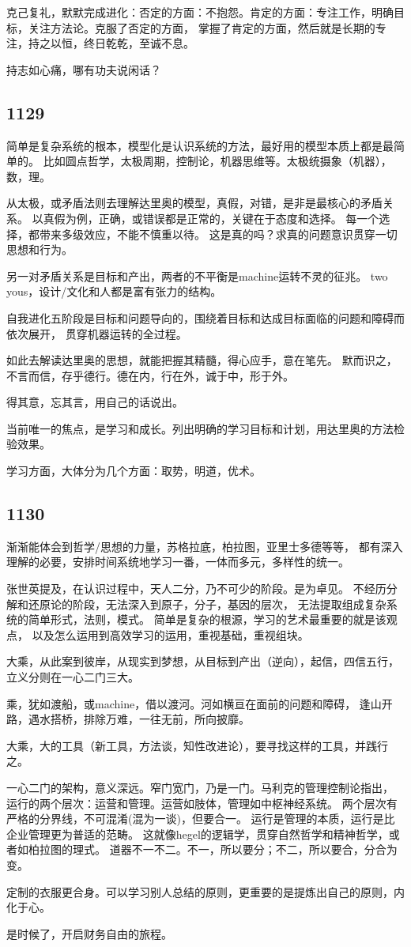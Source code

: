克己复礼，默默完成进化：否定的方面：不抱怨。肯定的方面：专注工作，明确目标，关注方法论。克服了否定的方面，
掌握了肯定的方面，然后就是长期的专注，持之以恒，终日乾乾，至诚不息。

持志如心痛，哪有功夫说闲话？

\subsection{1129}

简单是复杂系统的根本，模型化是认识系统的方法，最好用的模型本质上都是最简单的。
比如圆点哲学，太极周期，控制论，机器思维等。太极统摄象（机器），数，理。

从太极，或矛盾法则去理解达里奥的模型，真假，对错，是非是最核心的矛盾关系。
以真假为例，正确，或错误都是正常的，关键在于态度和选择。
每一个选择，都带来多级效应，不能不慎重以待。
这是真的吗？求真的问题意识贯穿一切思想和行为。

另一对矛盾关系是目标和产出，两者的不平衡是machine运转不灵的征兆。
two yous，设计/文化和人都是富有张力的结构。

自我进化五阶段是目标和问题导向的，围绕着目标和达成目标面临的问题和障碍而依次展开，
贯穿机器运转的全过程。

如此去解读达里奥的思想，就能把握其精髓，得心应手，意在笔先。
默而识之，不言而信，存乎德行。德在内，行在外，诚于中，形于外。

得其意，忘其言，用自己的话说出。

当前唯一的焦点，是学习和成长。列出明确的学习目标和计划，用达里奥的方法检验效果。

学习方面，大体分为几个方面：取势，明道，优术。

\subsection{1130}

渐渐能体会到哲学/思想的力量，苏格拉底，柏拉图，亚里士多德等等，
都有深入理解的必要，安排时间系统地学习一番，一体而多元，多样性的统一。

张世英提及，在认识过程中，天人二分，乃不可少的阶段。是为卓见。
不经历分解和还原论的阶段，无法深入到原子，分子，基因的层次，
无法提取组成复杂系统的简单形式，法则，模式。
简单是复杂的根源，学习的艺术最重要的就是该观点，
以及怎么运用到高效学习的运用，重视基础，重视组块。

大乘，从此案到彼岸，从现实到梦想，从目标到产出（逆向），起信，四信五行，
立义分则在一心二门三大。

乘，犹如渡船，或machine，借以渡河。河如横亘在面前的问题和障碍，
逢山开路，遇水搭桥，排除万难，一往无前，所向披靡。

大乘，大的工具（新工具，方法谈，知性改进论），要寻找这样的工具，并践行之。

一心二门的架构，意义深远。窄门宽门，乃是一门。马利克的管理控制论指出，
运行的两个层次：运营和管理。运营如肢体，管理如中枢神经系统。
两个层次有严格的分界线，不可混淆(混为一谈)，但要合一。
运行是管理的本质，运行是比企业管理更为普适的范畴。
这就像hegel的逻辑学，贯穿自然哲学和精神哲学，或者如柏拉图的理式。
道器不一不二。不一，所以要分；不二，所以要合，分合为变。

定制的衣服更合身。可以学习别人总结的原则，更重要的是提炼出自己的原则，内化于心。

是时候了，开启财务自由的旅程。
